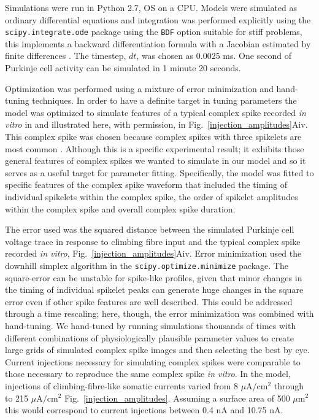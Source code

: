 \documentclass[utf8]{frontiersSCNS} %
\begin{document}
Simulations were run in Python 2.7, OS on a CPU. Models were simulated
as ordinary differential equations and integration was performed
explicitly using the \texttt{scipy.integrate.ode} package using the
\texttt{BDF} option suitable for stiff problems, this implements a
backward differentiation formula with a Jacobian estimated by finite
differences \cite{ByrneHindmarsh1975}. The timestep, $dt$, was chosen
as 0.0025 ms. One second of Purkinje cell activity can be simulated in
1 minute 20 seconds.

Optimization was performed using a mixture of error minimization and
hand-tuning techniques. In order to have a definite
target in tuning parameters the model was optimized to simulate
features of a typical complex spike recorded \textit{in vitro} in
\cite{DavieEtAl2008} and illustrated here, with permission, in
Fig.~\ref{injection_amplitudes}Aiv. This complex spike was chosen
because complex spikes with three spikelets are most common
\cite{BurroughsEtAl2016}. Although this is a specific experimental
result; it exhibits those general features of complex spikes we wanted
to simulate in our model and so it serves as a useful target for
parameter fitting. Specifically, the model was fitted to specific
features of the complex spike waveform that included the timing of
individual spikelets within the complex spike, the order of spikelet
amplitudes within the complex spike and overall complex spike
duration.

The error used was the squared distance between the simulated Purkinje
cell voltage trace in response to climbing fibre input and the typical
complex spike recorded \textit{in vitro},
Fig.~\ref{injection_amplitudes}Aiv. Error minimization used the
downhill simplex algorithm in the \texttt{scipy.optimize.minimize}
package. The square-error can be unstable for spike-like profiles,
given that minor changes in the timing of individual spikelet peaks
can generate huge changes in the square error even if other spike
features are well described. This could be addressed through a time
rescaling; here, though, the error minimization was combined with
hand-tuning. We hand-tuned by running simulations thousands of times
with different combinations of physiologically plausible parameter
values to create large grids of simulated complex spike images and
then selecting the best by eye. Current injections necessary for
simulating complex spikes were comparable to those necessary to
reproduce the same complex spike \textit{in vitro}. In the model,
injections of climbing-fibre-like somatic currents varied from 8
$\mu$A$/$cm$^2$ through to 215 $\mu$A$/$cm$^2$
Fig.~\ref{injection_amplitudes}. Assuming a surface area of 500
$\mu$m$^2$ this would correspond to current injections between 0.4 nA
and 10.75 nA.
\end{document}
